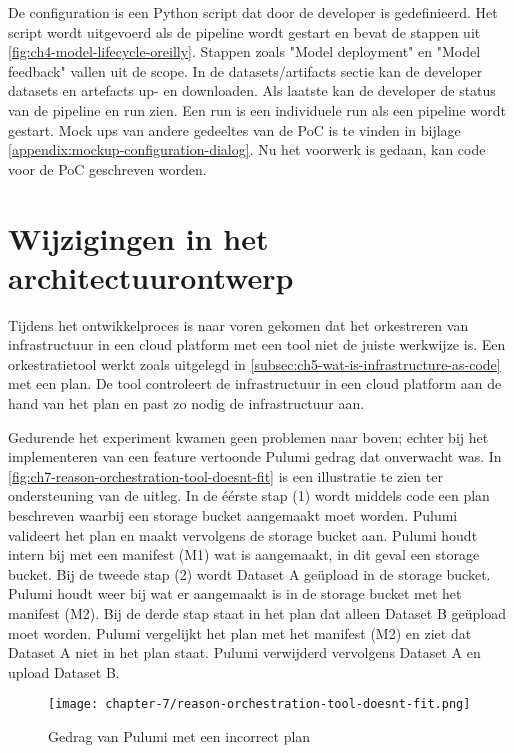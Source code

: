De configuration is een Python script dat door de developer is gedefinieerd. Het script wordt uitgevoerd als de pipeline wordt gestart en bevat de stappen uit \autoref{fig:ch4-model-lifecycle-oreilly}. Stappen zoals \string"Model deployment\string" en \string"Model feedback\string" vallen uit de scope. In de datasets/\glspl{artifact} sectie kan de developer datasets en artefacts up- en downloaden. Als laatste kan de developer de status van de pipeline en run zien. Een run is een individuele run als een pipeline wordt gestart. Mock ups van andere gedeeltes van de PoC is te vinden in bijlage \ref{appendix:mockup-configuration-dialog}. Nu het voorwerk is gedaan, kan code voor de PoC geschreven worden.

\section{Wijzigingen in het architectuurontwerp}\label{sec:ch7-wijzigingen-in-het-architectuurontwerp}
Tijdens het ontwikkelproces is naar voren gekomen dat het orkestreren van infrastructuur in een cloud platform met een tool niet de juiste werkwijze is. Een orkestratietool werkt zoals uitgelegd in \autoref{subsec:ch5-wat-is-infrastructure-as-code} met een plan. De tool controleert de infrastructuur in een cloud platform aan de hand van het plan en past zo nodig de infrastructuur aan.

Gedurende het experiment kwamen geen problemen naar boven; echter bij het implementeren van een feature vertoonde Pulumi gedrag dat onverwacht was. In \autoref{fig:ch7-reason-orchestration-tool-doesnt-fit} is een illustratie te zien ter ondersteuning van de uitleg. In de éérste stap (1) wordt middels code een plan beschreven waarbij een storage bucket aangemaakt moet worden. Pulumi valideert het plan en maakt vervolgens de storage bucket aan. Pulumi houdt intern bij met een manifest (M1) wat is aangemaakt, in dit geval een storage bucket. Bij de tweede stap (2) wordt Dataset A geüpload in de storage bucket. Pulumi houdt weer bij wat er aangemaakt is in de storage bucket met het manifest (M2). Bij de derde stap staat in het plan dat alleen Dataset B geüpload moet worden. Pulumi vergelijkt het plan met het manifest (M2) en ziet dat Dataset A niet in het plan staat. Pulumi verwijderd vervolgens Dataset A en upload Dataset B.

\begin{figure}[hbt!]
  \centering
  \texttt{[image: chapter-7/reason-orchestration-tool-doesnt-fit.png]}
  \caption{Gedrag van Pulumi met een incorrect plan}
  \label{fig:ch7-reason-orchestration-tool-doesnt-fit}
\end{figure}

